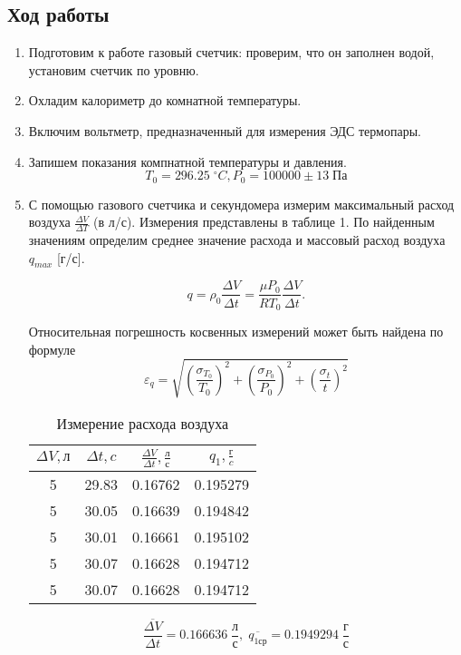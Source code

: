 \documentclass[a4paper,12pt]{article}
\begin{document}
	\subsection{Ход работы}
	\begin{enumerate}
		\item Подготовим к работе газовый счетчик: проверим, что он заполнен  водой, установим счетчик по уровню.
		\item Охладим калориметр до комнатной температуры.
		\item Включим вольтметр, предназначенный для измерения ЭДС термопары. 
		\item Запишем показания компнатной температуры и давления. $$T_{0} = 296.25 \; ^\circ C, P_{0} = 100000 \pm 13 \; {Па} $$
		\item С помощью газового счетчика и секундомера измерим максимальный расход воздуха $\frac{\Delta V}{\Delta T}$ (в л/с). Измерения представлены в таблице 1. По найденным значениям определим среднее значение расхода и массовый расход воздуха $q_{max}$ [г/с].
		
		$$q = \rho_0 \frac{\Delta V}{\Delta t} = \frac{\mu P_0}{RT_0} \frac{\Delta V}{\Delta t}.$$
		
		Относительная погрешность косвенных измерений может быть найдена по формуле $$\varepsilon_{q} = \sqrt{(\frac{\sigma_{T_0}}{T_{0}})^2+(\frac{\sigma_{P_0}}{P_{0}})^2+ (\frac{\sigma_t}{t})^2}$$ 


	\begin{table}
	\begin{center}
	\begin{tabular}{|c|c|c|c|}
				\hline
				$\Delta V, л$ & $\Delta t, c$ & $\frac{\Delta V}{\Delta t},\frac{л}{с}$ & $q_{1},\frac{г}{c} $ \\
				\hline
				5 & 29.83 & 0.16762 & 0.195279 \\ 
				\hline
				5 & 30.05 & 0.16639 & 0.194842  \\
				\hline
				5 & 30.01 &  0.16661 & 0.195102  \\
				\hline
				5 & 30.07 & 0.16628 & 0.194712 \\
				\hline
				5 & 30.07 & 0.16628 & 0.194712 \\
				\hline
	
	\end{tabular}
	\end{center}
	\caption{Измерение расхода воздуха}
	\end{table}
	$$\overline{\frac{\Delta V}{\Delta t}} = 0.166636 \; \frac{л}{с} ,\; \overline{q_{1ср}} = 0.1949294 \; \frac{г}{с} $$
	

\end{enumerate}
\end{document}
